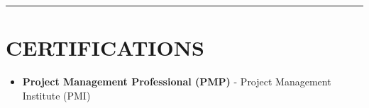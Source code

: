 \documentclass[10pt,a4paper]{article}
\begin{document}
\vspace{2pt}
\noindent\rule{\textwidth}{0.8pt}

\section*{CERTIFICATIONS}

{\small
\begin{itemize}[leftmargin=0.15in, itemsep=1.5pt, topsep=0pt, parsep=0pt, partopsep=0pt, label=$\bullet$]
    \item \textbf{Project Management Professional (PMP)\textregistered} - Project Management Institute (PMI)\textregistered
\end{itemize}
}
\end{document}
